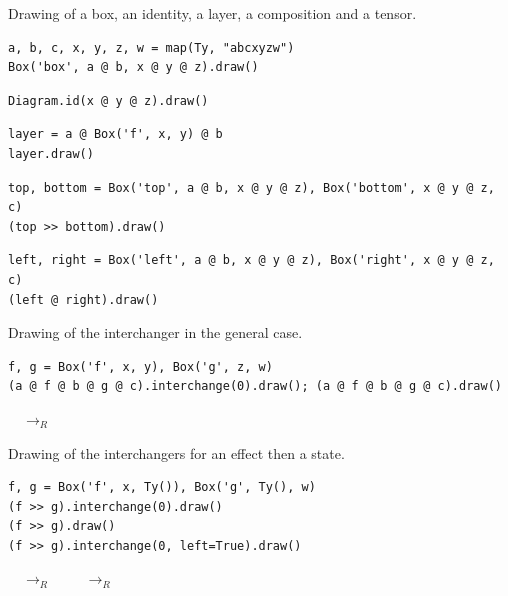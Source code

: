 \begin{example}
{\normalfont Drawing of a box, an identity, a layer, a composition and a tensor.}

\begin{verbatim}
a, b, c, x, y, z, w = map(Ty, "abcxyzw")
Box('box', a @ b, x @ y @ z).draw()
\end{verbatim}


\begin{verbatim}
Diagram.id(x @ y @ z).draw()
\end{verbatim}


\begin{verbatim}
layer = a @ Box('f', x, y) @ b
layer.draw()
\end{verbatim}


\begin{verbatim}
top, bottom = Box('top', a @ b, x @ y @ z), Box('bottom', x @ y @ z, c)
(top >> bottom).draw()
\end{verbatim}


\begin{verbatim}
left, right = Box('left', a @ b, x @ y @ z), Box('right', x @ y @ z, c)
(left @ right).draw()
\end{verbatim}

\end{example}

\begin{example}
{\normalfont Drawing of the interchanger in the general case.}

\begin{verbatim}
f, g = Box('f', x, y), Box('g', z, w)
(a @ f @ b @ g @ c).interchange(0).draw(); (a @ f @ b @ g @ c).draw()
\end{verbatim}

\begin{center}
$\quad \to_R \quad$ 
\end{center}
\end{example}

\begin{example}
{\normalfont Drawing of the interchangers for an effect then a state.}

\begin{verbatim}
f, g = Box('f', x, Ty()), Box('g', Ty(), w)
(f >> g).interchange(0).draw()
(f >> g).draw()
(f >> g).interchange(0, left=True).draw()
\end{verbatim}

\begin{center}
$\quad \to_R \quad$ 
$\quad \to_R \quad$ 
\end{center}
\end{example}

